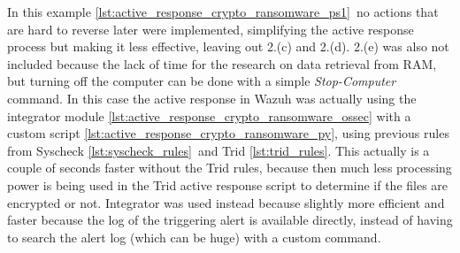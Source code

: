 \linej
In this example \ref{lst:active_response_crypto_ransomware_ps1}\ no actions that are hard to reverse later were implemented, simplifying the active response process but making it less effective, leaving out 2.(c) and 2.(d). 2.(e) was also not included because the lack of time for the research on data retrieval from RAM, but turning off the computer can be done with a simple \textit{Stop-Computer} command.
\linej
\linej
In this case the active response in Wazuh was actually using the integrator module \ref{lst:active_response_crypto_ransomware_ossec} with a custom script \ref{lst:active_response_crypto_ransomware_py}, using previous rules from Syscheck \ref{lst:syscheck_rules}\ and Trid \ref{lst:trid_rules}.
This actually is a couple of seconds faster without the Trid rules, because then much less processing power is being used in the Trid active response script to determine if the files are encrypted or not.
Integrator\cite{integrator} was used instead because slightly more efficient and faster because the log of the triggering alert is available directly, instead of having to search the alert log (which can be huge) with a custom command.


